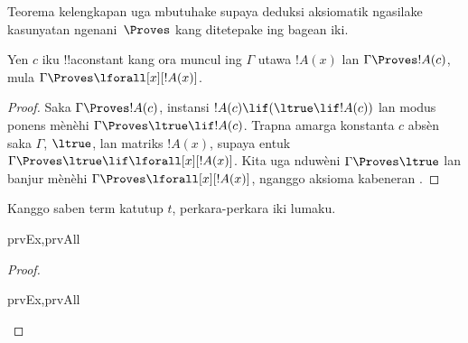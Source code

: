 \documentclass[../../../include/open-logic-section]{subfiles}
\begin{document}


\begin{explain}
  Teorema kelengkapan uga mbutuhake supaya deduksi aksiomatik
  ngasilake kasunyatan ngenani~$\Proves$ kang ditetepake ing bagean
  iki.
\end{explain}

\begin{thm}
 Yen $c$ iku !!a{constant} kang ora
muncul ing $\Gamma$ utawa $!A(x)$ lan $\Gamma \Proves !A(c)$, mula
$\Gamma \Proves \lforall[x][!A(x)]$.
\end{thm}

\begin{proof}
Saka $\Gamma\Proves !A(c)$, instansi 
$!A(c)\lif(\ltrue\lif !A(c))$ lan modus ponens mènèhi
$\Gamma \Proves \ltrue \lif !A(c)$.
Trapna \QR{} amarga
konstanta $c$ absèn saka $\Gamma$, $\ltrue$, lan matriks $!A(x)$,
supaya entuk $\Gamma\Proves\ltrue\lif\lforall[x][!A(x)]$.
Kita uga nduwèni $\Gamma \Proves \ltrue$ lan  banjur
mènèhi $\Gamma\Proves\lforall[x][!A(x)]$,
nganggo aksioma kabeneran .
\end{proof}

\begin{prop}
Kanggo saben term katutup $t$, perkara-perkara iki lumaku.
\begin{tagenumerate}{prvEx,prvAll}

\end{tagenumerate}
\end{prop}

\begin{proof}
\begin{tagenumerate}{prvEx,prvAll}
\end{tagenumerate}
\end{proof}
\end{document}
